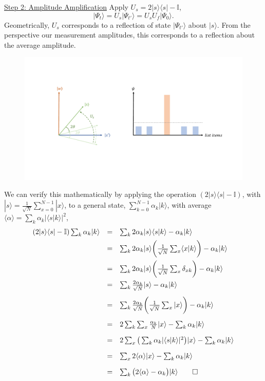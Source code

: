 \documentclass[11pt]{article} %
\begin{document}
\newline
\underline{Step 2: Amplitude Amplification}
\newline
Apply $U_s=2|s\rangle\langle s|-\mathbb{I}$,
\begin{equation*}
     |\Psi_{t}\rangle = U_s |\Psi_{t'}\rangle = U_s U_f |\Psi_0\rangle.
\end{equation*}
Geometrically, $U_s$ corresponds to a reflection of state $|\Psi_{t'}\rangle$ about $|s\rangle$. From the perspective our measurement amplitudes, this corresponds to a reflection about the average amplitude. 
\begin{figure}[h!]
    \centering
    \includegraphics[width=.95\textwidth]{Lecture7Figs/step3.pdf}
    \label{fig:search_item}
\end{figure}
We can verify this mathematically by applying the operation $(2|s\rangle\langle s|-\mathbb{I})$, with $|s\rangle = \frac{1}{\sqrt{N}}\sum_{x=0}^{N-1}|x\rangle$, to a general state, $\sum_{k=0}^{N-1} \alpha_k |k\rangle$, with average $\langle\alpha\rangle=\sum_k \alpha_k|\langle s|k\rangle|^2$,
\begin{equation*}
    \begin{array} {lcl} 
        (2|s\rangle\langle s|-\mathbb{I}) \sum_k \alpha_k |k\rangle & = & \sum_k 2\alpha_k |s\rangle\langle s|k\rangle-\alpha_k |k\rangle \\[5pt] 
        & = & \sum_k 2\alpha_k |s\rangle \bigg(\frac{1}{\sqrt{N}}\sum_x\langle x|k\rangle\bigg)-\alpha_k |k\rangle \\[10pt]
        & = & \sum_k 2\alpha_k |s\rangle \bigg(\frac{1}{\sqrt{N}}\sum_x\delta_{xk}\bigg)-\alpha_k |k\rangle \\[10pt]
        & = & \sum_k \frac{2\alpha_k}{\sqrt{N}} |s\rangle-\alpha_k |k\rangle \\[10pt]
        & = & \sum_k \frac{2\alpha_k}{\sqrt{N}} \bigg(\frac{1}{\sqrt{N}}\sum_x|x\rangle\bigg)-\alpha_k |k\rangle \\[15pt]
        & = & 2\sum_k \sum_x\frac{\alpha_k}{N}|x\rangle-\sum_k\alpha_k |k\rangle \\[10pt]
        & = & 2\sum_x\big(\sum_k \alpha_k|\langle s|k\rangle|^2\big)|x\rangle-\sum_k\alpha_k |k\rangle \\[10pt]
        & = & \sum_x 2\langle\alpha\rangle |x\rangle-\sum_k\alpha_k |k\rangle \\[10pt]
        & = & \sum_k \big(2\langle\alpha\rangle-\alpha_k\big) |k\rangle \qed
    \end{array}
\end{equation*}
\end{document}
